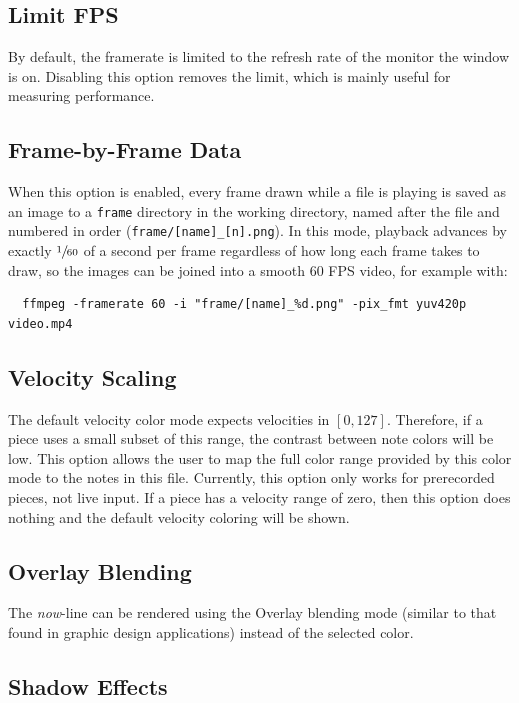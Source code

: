 \documentclass[english]{article}
\providecommand{\mi}[1]{\texttt{#1}}
\begin{document}
\subsection{Limit FPS}

By default, the framerate is limited to the refresh rate of the monitor the window is on. Disabling this option removes the
limit, which is mainly useful for measuring performance.

\subsection{Frame-by-Frame Data}

When this option is enabled, every frame drawn while a file is playing is saved as an image to a \mi{frame} directory
in the working directory, named after the file and numbered in order
(\mi{frame/[name]_[n].png}). In this mode, playback advances by exactly $\sfrac{1}{60}$ of a second per frame regardless
of how long each frame takes to draw, so the images can be joined into a smooth 60 FPS video, for example with:

\begin{verbatim}
  ffmpeg -framerate 60 -i "frame/[name]_%d.png" -pix_fmt yuv420p video.mp4
\end{verbatim}

\subsection{Velocity Scaling}

The default velocity color mode expects velocities in $[0, 127]$. Therefore, if a piece uses a small subset of this range,
the contrast between note colors will be low. This option allows the user to map the full color range provided by this
color mode to the notes in this file. Currently, this option only works for prerecorded pieces, not live input.
If a piece has a velocity range of zero, then this option does nothing and the default velocity coloring will
be shown.

\subsection{Overlay Blending}

The \textit{now}-line can be rendered using the Overlay blending mode (similar to that found in graphic design applications) instead of the selected color.

\subsection{Shadow Effects}
\end{document}
